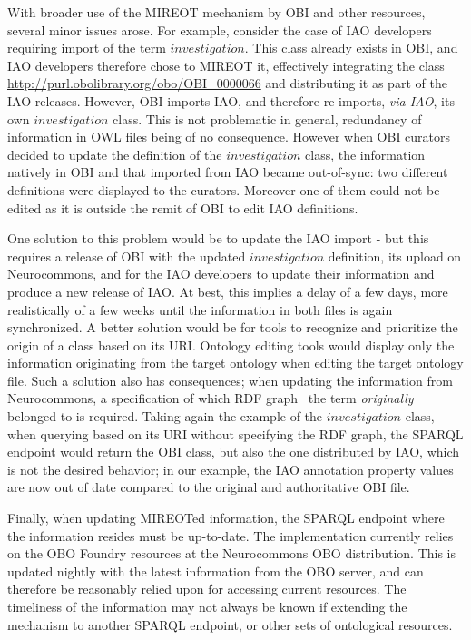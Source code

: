\documentclass[jou]{ao2e}%
\begin{document}
With broader use of the MIREOT mechanism by OBI and other resources, several minor issues arose.
For example, consider the case of \ac{IAO} developers requiring import of the term $investigation$.  This class already exists in \ac{OBI}, and \ac{IAO} developers therefore chose to MIREOT it, effectively integrating the class \url{http://purl.obolibrary.org/obo/OBI_0000066} and distributing it as part of the \ac{IAO} releases.
However, \ac{OBI} imports \ac{IAO}, and therefore re imports, \emph{via IAO}, its own $investigation$ class. This is not problematic in general, redundancy of information in OWL files being of no consequence. However when \ac{OBI} curators decided to update the definition of the $investigation$ class, the information natively in \ac{OBI} and that imported from \ac{IAO} became out-of-sync: two different definitions were displayed to the curators. Moreover one of them could not be edited as it is outside the remit of OBI to edit IAO definitions.

One solution to this problem would be to update the \ac{IAO} import - but this requires a release of \ac{OBI} with the updated $investigation$ definition, its upload on Neurocommons, and for the \ac{IAO} developers to update their information and produce a new release of \ac{IAO}. At best, this implies a delay of a few days, more realistically of a few weeks until the information in both files is again synchronized.
A better solution would be for tools to recognize and prioritize the origin of a class based on its URI. Ontology editing tools would display only the information originating from the target ontology when editing the target ontology file.
Such a solution also has consequences; when updating the information from Neurocommons, a specification of which \ac{RDF} graph~\citep{RDF} the term \emph{originally} belonged to is required. Taking again the example of the $investigation$ class, when querying based on its URI without specifying the RDF graph, the SPARQL endpoint would return the \ac{OBI} class, but also the one distributed by \ac{IAO}, which is not the desired behavior; in our example, the \ac{IAO} annotation property values are now out of date compared to the original and authoritative \ac{OBI} file. %

Finally, when updating MIREOTed information, the SPARQL endpoint where the information resides must be up-to-date. The implementation currently relies on the \ac{OBO} Foundry resources at the Neurocommons \ac{OBO} distribution. This is updated nightly with the latest information from the \ac{OBO} server, and can therefore be reasonably relied upon for accessing current resources. The timeliness of the information may not always be known if extending the mechanism to another SPARQL endpoint, or other sets of ontological resources.
\end{document}
